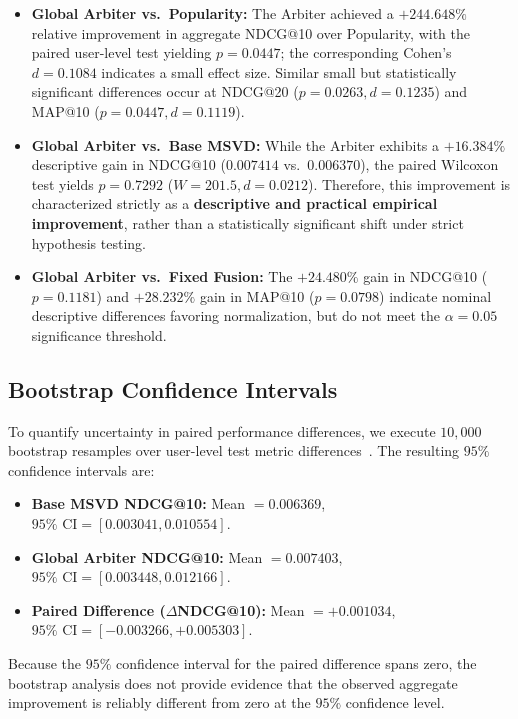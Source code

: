 \documentclass[conference]{IEEEtran}
\begin{document}
\begin{itemize}
    \item \textbf{Global Arbiter vs.\ Popularity:} The Arbiter achieved a $+244.648\%$ relative improvement in aggregate NDCG@10 over Popularity, with the paired user-level test yielding $p = 0.0447$; the corresponding Cohen's $d = 0.1084$ indicates a small effect size. Similar small but statistically significant differences occur at NDCG@20 ($p = 0.0263, d = 0.1235$) and MAP@10 ($p = 0.0447, d = 0.1119$).
    \item \textbf{Global Arbiter vs.\ Base MSVD:} While the Arbiter exhibits a $+16.384\%$ descriptive gain in NDCG@10 ($0.007414$ vs.\ $0.006370$), the paired Wilcoxon test yields $p = 0.7292$ ($W = 201.5, d = 0.0212$). Therefore, this improvement is characterized strictly as a \textbf{descriptive and practical empirical improvement}, rather than a statistically significant shift under strict hypothesis testing.
    \item \textbf{Global Arbiter vs.\ Fixed Fusion:} The $+24.480\%$ gain in NDCG@10 ($p = 0.1181$) and $+28.232\%$ gain in MAP@10 ($p = 0.0798$) indicate nominal descriptive differences favoring normalization, but do not meet the $\alpha=0.05$ significance threshold.
\end{itemize}

\subsection{Bootstrap Confidence Intervals}
To quantify uncertainty in paired performance differences, we execute $10,000$ bootstrap resamples over user-level test metric differences~\cite{efron1994introduction}. The resulting $95\%$ confidence intervals are:
\begin{itemize}
    \item \textbf{Base MSVD NDCG@10:} Mean $= 0.006369$, $95\%\text{ CI} = [0.003041, 0.010554]$.
    \item \textbf{Global Arbiter NDCG@10:} Mean $= 0.007403$, $95\%\text{ CI} = [0.003448, 0.012166]$.
    \item \textbf{Paired Difference ($\Delta$NDCG@10):} Mean $= +0.001034$, $95\%\text{ CI} = [-0.003266, +0.005303]$.
\end{itemize}
Because the $95\%$ confidence interval for the paired difference spans zero, the bootstrap analysis does not provide evidence that the observed aggregate improvement is reliably different from zero at the $95\%$ confidence level.
\end{document}
